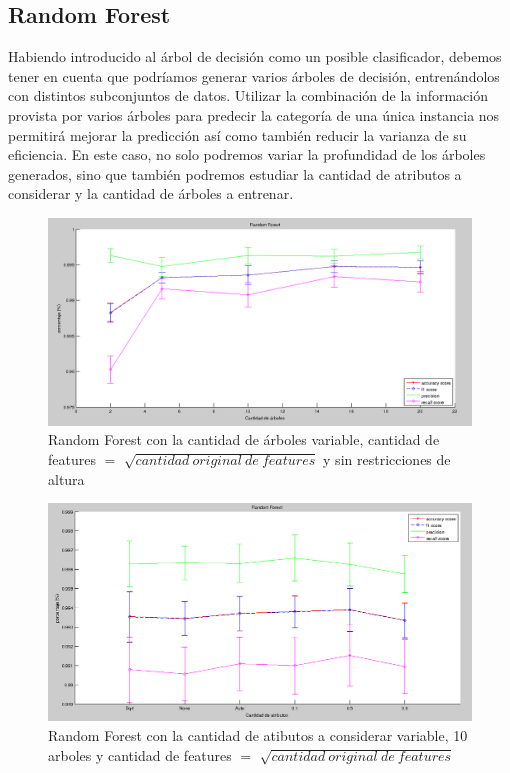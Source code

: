 \documentclass{article}
\begin{document}
\subsection{Random Forest}

Habiendo introducido al árbol de decisión como un posible clasificador, debemos tener en cuenta que podríamos generar varios árboles de decisión, entrenándolos con distintos subconjuntos de datos. Utilizar la combinación de la información provista por varios árboles para predecir la categoría de una única instancia nos permitirá mejorar la predicción así como también reducir la varianza de su eficiencia. En este caso, no solo podremos variar la profundidad de los árboles generados, sino que también podremos estudiar la cantidad de atributos a considerar y la cantidad de árboles a entrenar.

\begin{figure}[H] %
\begin{center}
\includegraphics[width=500pt]{randomForestScoreArboles.png}
\caption{Random Forest con la cantidad de árboles variable, cantidad de features $=$ $\sqrt{cantidad\ original\ de\ features}$ y sin restricciones de altura}
\label{randomForestArboles}
\end{center}
\end{figure}

\begin{figure}[H] %
\begin{center}
\includegraphics[width=500pt]{randomForestScoresAtributos.png}
\caption{Random Forest con la cantidad de atibutos a considerar variable, 10 arboles y cantidad de features $=$ $\sqrt{cantidad\ original\ de\ features}$}
\label{randomForestAtributos}
\end{center}
\end{figure}
\end{document}
